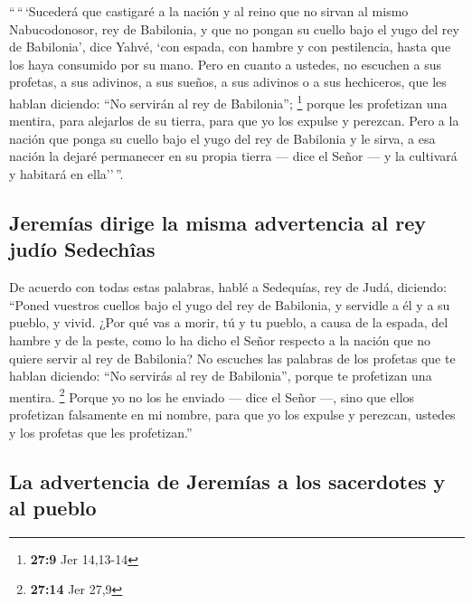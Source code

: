 \begin{paracol}{2}
 ``\,``\,`Sucederá que castigaré a la nación y al reino
que no sirvan al mismo Nabucodonosor, rey de Babilonia, y que no pongan
su cuello bajo el yugo del rey de Babilonia', dice Yahvé, `con espada,
con hambre y con pestilencia, hasta que los haya consumido por su mano.
 Pero en cuanto a ustedes, no escuchen a sus profetas, a
sus adivinos, a sus sueños, a sus adivinos o a sus hechiceros, que les
hablan diciendo: ``No servirán al rey de Babilonia''; \footnote{\textbf{27:9}
  Jer 14,13-14}  porque les profetizan una mentira, para
alejarlos de su tierra, para que yo los expulse y perezcan.
 Pero a la nación que ponga su cuello bajo el yugo del
rey de Babilonia y le sirva, a esa nación la dejaré permanecer en su
propia tierra --- dice el Señor --- y la cultivará y habitará en
ella''\,''.

\hypertarget{jeremuxedas-dirige-la-misma-advertencia-al-rey-juduxedo-sedechuxeeas}{%
\subsection{Jeremías dirige la misma advertencia al rey judío
Sedechîas}\label{jeremuxedas-dirige-la-misma-advertencia-al-rey-juduxedo-sedechuxeeas}}

 De acuerdo con todas estas palabras, hablé a Sedequías,
rey de Judá, diciendo: ``Poned vuestros cuellos bajo el yugo del rey de
Babilonia, y servidle a él y a su pueblo, y vivid.  ¿Por
qué vas a morir, tú y tu pueblo, a causa de la espada, del hambre y de
la peste, como lo ha dicho el Señor respecto a la nación que no quiere
servir al rey de Babilonia?  No escuches las palabras de
los profetas que te hablan diciendo: ``No servirás al rey de
Babilonia'', porque te profetizan una mentira. \footnote{\textbf{27:14}
  Jer 27,9}  Porque yo no los he enviado --- dice el
Señor ---, sino que ellos profetizan falsamente en mi nombre, para que
yo los expulse y perezcan, ustedes y los profetas que les profetizan.''

\hypertarget{la-advertencia-de-jeremuxedas-a-los-sacerdotes-y-al-pueblo}{%
\subsection{La advertencia de Jeremías a los sacerdotes y al
pueblo}\label{la-advertencia-de-jeremuxedas-a-los-sacerdotes-y-al-pueblo}}


\end{paracol}
